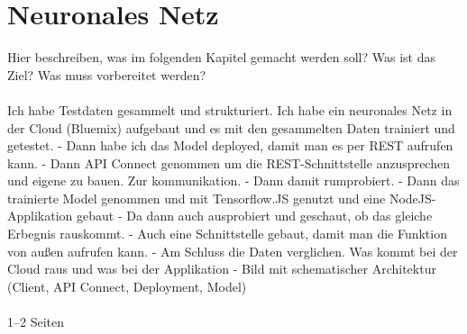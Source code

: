 \chapter{Neuronales Netz}
\label{ch:neuronalesNetz}

Hier beschreiben, was im folgenden Kapitel gemacht werden soll? Was ist das Ziel? Was muss vorbereitet werden?
\\ \\
Ich habe Testdaten gesammelt und strukturiert. Ich habe ein neuronales Netz in der Cloud (Bluemix) aufgebaut und es
mit den gesammelten Daten trainiert und getestet. - Dann habe ich das Model deployed, damit man es per REST aufrufen kann.
- Dann API Connect genommen um die REST-Schnittstelle anzusprechen und eigene zu bauen. Zur kommunikation.
- Dann damit rumprobiert. - Dann das trainierte Model genommen und mit Tensorflow.JS genutzt und eine NodeJS-Applikation gebaut
- Da dann auch ausprobiert und geschaut, ob das gleiche Erbegnis rauskommt.
- Auch eine Schnittstelle gebaut, damit man die Funktion von außen aufrufen kann. - Am Schluss die Daten verglichen. Was
kommt bei der Cloud raus und was bei der Applikation - Bild mit schematischer Architektur (Client, API Connect, Deployment, Model)
\\ \\
1--2 Seiten